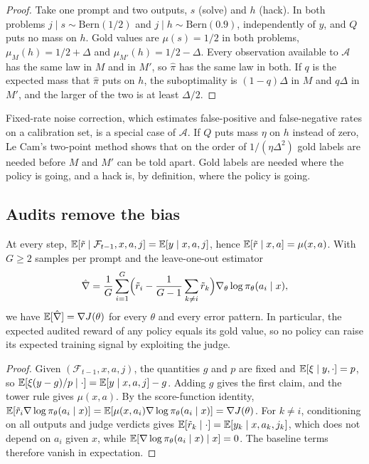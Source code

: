 \begin{proof}
Take one prompt and two outputs, $s$ (solve) and $h$ (hack). In both problems $j\mid s\sim\mathrm{Bern}(1/2)$ and $j\mid h\sim\mathrm{Bern}(0.9)$, independently of $y$, and $Q$ puts no mass on $h$. Gold values are $\mu(s)=1/2$ in both problems, $\mu_M(h)=1/2+\Delta$ and $\mu_{M'}(h)=1/2-\Delta$. Every observation available to $\mathcal A$ has the same law in $M$ and in $M'$, so $\hat\pi$ has the same law in both. If $q$ is the expected mass that $\hat\pi$ puts on $h$, the suboptimality is $(1-q)\Delta$ in $M$ and $q\Delta$ in $M'$, and the larger of the two is at least $\Delta/2$.
\end{proof}

Fixed-rate noise correction, which estimates false-positive and false-negative rates on a calibration set, is a special case of $\mathcal A$. If $Q$ puts mass $\eta$ on $h$ instead of zero, Le Cam's two-point method \citep{tsybakov2009} shows that on the order of $1/(\eta\Delta^2)$ gold labels are needed before $M$ and $M'$ can be told apart. Gold labels are needed where the policy is going, and a hack is, by definition, where the policy is going.

\subsection{Audits remove the bias}

\begin{theorem}
\label{thm:unbiased}
At every step, $\mathbb{E}[\tilde r\mid\mathcal F_{t-1},x,a,j]=\mathbb{E}[y\mid x,a,j]$, hence $\mathbb{E}[\tilde r\mid x,a]=\mu(x,a)$. With $G\ge2$ samples per prompt and the leave-one-out estimator \citep{kool2019buy4,ahmadian2024back}
\[
\hat\nabla=\frac1G\sum_{i=1}^{G}\Bigl(\tilde r_i-\frac{1}{G-1}\sum_{k\ne i}\tilde r_k\Bigr)\nabla_\theta\log\pi_\theta(a_i\mid x),
\]
we have $\mathbb{E}[\hat\nabla]=\nabla J(\theta)$ for every $\theta$ and every error pattern. In particular, the expected audited reward of any policy equals its gold value, so no policy can raise its expected training signal by exploiting the judge.
\end{theorem}

\begin{proof}
Given $(\mathcal F_{t-1},x,a,j)$, the quantities $g$ and $p$ are fixed and $\mathbb{E}[\xi\mid y,\cdot]=p$, so $\mathbb{E}[\xi(y-g)/p\mid\cdot]=\mathbb{E}[y\mid x,a,j]-g$. Adding $g$ gives the first claim, and the tower rule gives $\mu(x,a)$. By the score-function identity, $\mathbb{E}[\tilde r_i\nabla\log\pi_\theta(a_i\mid x)]=\mathbb{E}[\mu(x,a_i)\nabla\log\pi_\theta(a_i\mid x)]=\nabla J(\theta)$. For $k\ne i$, conditioning on all outputs and judge verdicts gives $\mathbb{E}[\tilde r_k\mid\cdot]=\mathbb{E}[y_k\mid x,a_k,j_k]$, which does not depend on $a_i$ given $x$, while $\mathbb{E}[\nabla\log\pi_\theta(a_i\mid x)\mid x]=0$. The baseline terms therefore vanish in expectation.
\end{proof}


